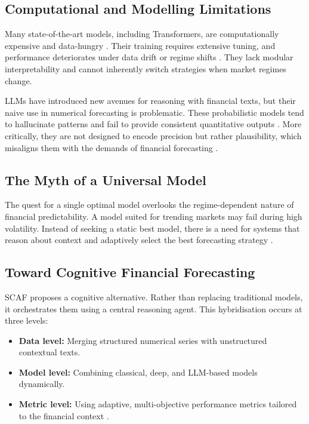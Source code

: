 \documentclass[conference]{IEEEtran}
\begin{document}
\subsection{Computational and Modelling Limitations}
Many state-of-the-art models, including Transformers, are computationally expensive and data-hungry \cite{li2023efficientformer}. Their training requires extensive tuning, and performance deteriorates under data drift or regime shifts \cite{fischer2018deep, nie2023patchtst}. They lack modular interpretability and cannot inherently switch strategies when market regimes change.

LLMs have introduced new avenues for reasoning with financial texts, but their naive use in numerical forecasting is problematic. These probabilistic models tend to hallucinate patterns and fail to provide consistent quantitative outputs \cite{luo2023llmbias}. More critically, they are not designed to encode precision but rather plausibility, which misaligns them with the demands of financial forecasting \cite{lin2022llmfinance}.

\subsection{The Myth of a Universal Model}
The quest for a single optimal model overlooks the regime-dependent nature of financial predictability. A model suited for trending markets may fail during high volatility. Instead of seeking a static best model, there is a need for systems that reason about context and adaptively select the best forecasting strategy \cite{zeng2022ltsflinear, yao2022react}.

\subsection{Toward Cognitive Financial Forecasting}
SCAF proposes a cognitive alternative. Rather than replacing traditional models, it orchestrates them using a central reasoning agent. This hybridisation occurs at three levels:
\begin{itemize}
\item \textbf{Data level:} Merging structured numerical series with unstructured contextual texts.
\item \textbf{Model level:} Combining classical, deep, and LLM-based models dynamically.
\item \textbf{Metric level:} Using adaptive, multi-objective performance metrics tailored to the financial context \cite{liu2021forecasting}.
\end{itemize}
\end{document}
